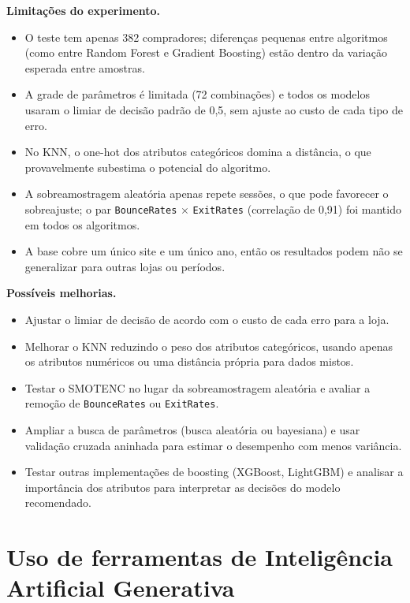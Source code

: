 \documentclass[11pt,a4paper]{article}
\DeclareRobustCommand{\atr}[1]{{\renewcommand{\_}{\textunderscore\allowbreak}\texttt{#1}}}
\begin{document}
\textbf{Limitações do experimento.}
\begin{itemize}
  \item O teste tem apenas 382 compradores; diferenças pequenas entre algoritmos (como entre Random Forest e Gradient
        Boosting) estão dentro da variação esperada entre amostras.
  \item A grade de parâmetros é limitada (72 combinações) e todos os modelos usaram o limiar de decisão padrão de
        0,5, sem ajuste ao custo de cada tipo de erro.
  \item No KNN, o one-hot dos atributos categóricos domina a distância, o que provavelmente subestima o potencial do
        algoritmo.
  \item A sobreamostragem aleatória apenas repete sessões, o que pode favorecer o sobreajuste; o par
        \atr{BounceRates} $\times$ \atr{ExitRates} (correlação de 0,91) foi mantido em todos os algoritmos.
  \item A base cobre um único site e um único ano, então os resultados podem não se generalizar para outras lojas ou
        períodos.
\end{itemize}

\textbf{Possíveis melhorias.}
\begin{itemize}
  \item Ajustar o limiar de decisão de acordo com o custo de cada erro para a loja.
  \item Melhorar o KNN reduzindo o peso dos atributos categóricos, usando apenas os atributos numéricos ou uma
        distância própria para dados mistos.
  \item Testar o SMOTENC no lugar da sobreamostragem aleatória e avaliar a remoção de \atr{BounceRates} ou
        \atr{ExitRates}.
  \item Ampliar a busca de parâmetros (busca aleatória ou bayesiana) e usar validação cruzada aninhada para estimar o
        desempenho com menos variância.
  \item Testar outras implementações de boosting (XGBoost, LightGBM) e analisar a importância dos atributos para
        interpretar as decisões do modelo recomendado.
\end{itemize}

\section{Uso de ferramentas de Inteligência Artificial Generativa}
\end{document}
